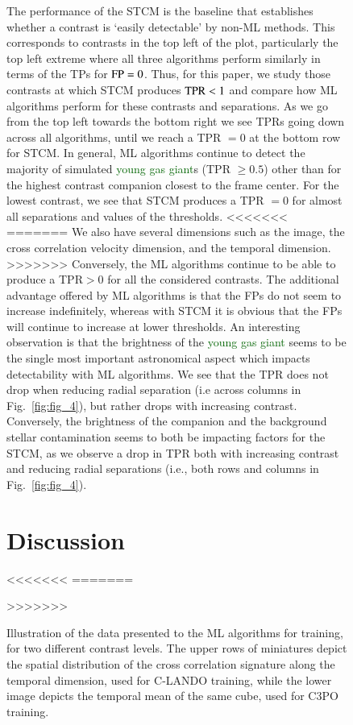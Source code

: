 \documentclass{aa}
\newcommand{\newchange}[1]{\textcolor{darkgreen}{#1}}
\begin{document}
{{{\begin{figure}[t]
{The performance of the STCM is the baseline that establishes whether a contrast is `easily detectable' by non-ML methods. 
This corresponds to contrasts in the top left of the plot, particularly the top left extreme where all three algorithms perform similarly in terms of the TPs for ${\rm FP}=0$.
Thus, for this paper, we study those contrasts at which STCM produces ${\rm TPR}<1$ and compare how ML algorithms perform for these contrasts and separations.
As we go from the top left towards the bottom right we see TPRs going down across all algorithms, until we reach a TPR $=0$ at the bottom row for STCM. 
In general, ML algorithms continue to detect the majority of simulated \newchange{young gas giant}s (TPR $\ge 0.5$) other than for the highest contrast companion closest to the frame center.
For the lowest contrast, we see that STCM produces a TPR $=0$ for almost all separations and values of the thresholds.
<<<<<<<
=======
We also have several dimensions such as the image, the cross correlation velocity dimension, and the temporal dimension.
>>>>>>>
Conversely, the ML algorithms continue to be able to produce a TPR$>0$ for all the considered contrasts.
The additional advantage offered by ML algorithms is that the FPs do not seem to increase indefinitely, whereas with STCM it is obvious that the FPs will continue to increase at lower thresholds.
An interesting observation is that the brightness of the \newchange{young gas giant} seems to be the single most important astronomical aspect which impacts detectability with ML algorithms.
We see that the TPR does not drop when reducing radial separation (i.e across columns in Fig.~\ref{fig:fig_4}), but rather drops with increasing contrast. 
Conversely,  the brightness of the companion and the background stellar contamination seems to both be impacting factors for the STCM, as we observe a drop in TPR both with increasing contrast and reducing radial separations (i.e., both rows and columns in Fig.~\ref{fig:fig_4}).




\section{Discussion}
<<<<<<<
=======
\caption{Illustration of the data presented to the ML algorithms for training, for two different contrast levels. The upper rows of miniatures depict the spatial distribution of the cross correlation signature along the temporal dimension, used for C-LANDO training, while the lower image depicts the temporal mean of the same cube, used for C3PO training. }
>>>>>>>
\label{sec:discussion}

}
\end{figure}}}}
\end{document}
